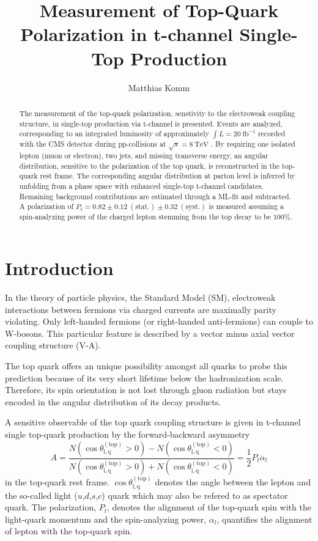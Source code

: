 \documentclass[a4paper]{jpconf}
\newcommand{\unit}[1]{\ensuremath{\mathrm{~#1}}}
\newcommand{\particle}[1]{\ensuremath{#1}}
\newcommand{\costheta}[0]{\cos\theta_{\mathrm{l,q}}^{\mathrm{(top)}}}
\begin{document}
\title{Measurement of Top-Quark Polarization in t-channel Single-Top Production}

\author{Matthias Komm}

\address{Centre for Cosmology, Particle Physics and Phenomenology, Universit\'e catholique de Louvain, 1348 Louvain-la-Neuve, Belgium}


\begin{abstract}
The measurement of the top-quark polarization, senstivity to the electroweak coupling structure, in single-top production via t-channel is presented. Events are analyzed, corresponding to an integrated luminosity of approximately $\int L=20\unit{fb^{-1}}$ recorded with the CMS detector during pp-collisions at $\sqrt{s}=8\unit{TeV}$ . By requiring one isolated lepton (muon or electron), two jets, and missing transverse energy, an angular distribution, sensitive to the  polarization of the top quark, is reconstructed in the top-quark rest frame. The corresponding angular distribution at parton level is inferred by unfolding from a phase space with enhanced single-top t-channel candidates. Remaining background contributions are estimated through a ML-fit and subtracted. A polarization of $P_{t}=0.82\pm0.12\mathrm{~(stat.)}\pm0.32\mathrm{~(syst.)}$ is measured assuming a spin-analyzing power of the charged lepton stemming from the top decay to be $100\%$.
\end{abstract}

\section{Introduction}
In the theory of particle physics, the Standard Model (SM), electroweak interactions between fermions via charged currents are maximally parity violating. Only left-handed fermions (or right-handed anti-fermions) can couple to W-bosons. This particular feature is described by a vector minus axial vector coupling structure (V-A).


The top quark offers an unique possibility amongst all quarks to probe this prediction because of its very short lifetime below the hadronization scale. Therefore, its spin orientation is not lost through gluon radiation but stays encoded in the angular distribution of its decay products.


A sensitive observable of the top quark coupling structure is given in t-channel single top-quark production by the forward-backward asymmetry
\begin{equation}
A=\frac{N(\costheta>0)-N(\costheta<0)}{N(\costheta>0)+N(\costheta<0)}=\frac{1}{2}P_{t}\alpha_{l}
\end{equation}
in the top-quark rest frame. $\costheta$ denotes the angle between the lepton and the so-called light ($\particle{u}$,$\particle{d}$,$\particle{s}$,$\particle{c}$) quark which may also be refered to as spectator quark. The polarization, $P_{t}$, denotes the alignment of the top-quark spin with the light-quark momentum and the spin-analyzing power, $\alpha_{l}$, quantifies the alignment of lepton with the top-quark spin.
\end{document}
